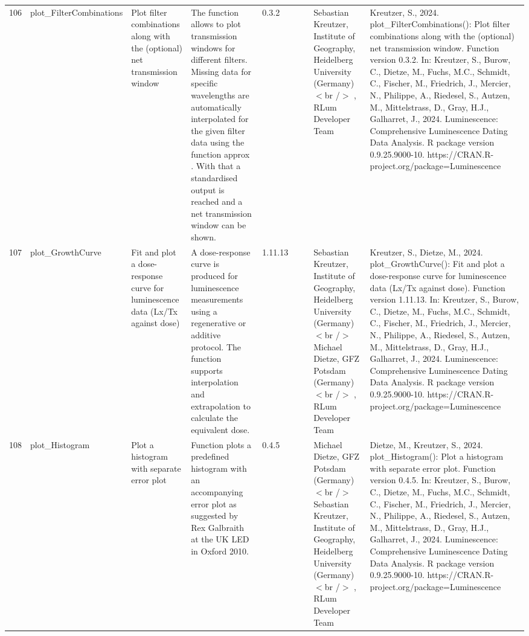 \begin{table}[ht]
\begin{tabular}{rllllllll}
 \\ 
  106 & plot\_FilterCombinations & Plot filter combinations along with the (optional) net transmission window & The function allows to plot transmission windows for different filters. Missing data for specific wavelengths are automatically interpolated for the given filter data using the function  approx . With that a standardised output is reached and a net transmission window can be shown. & 0.3.2
 &  &  & Sebastian Kreutzer, Institute of Geography, Heidelberg University (Germany)$<$br /$>$ , RLum Developer Team & Kreutzer, S., 2024. plot\_FilterCombinations(): Plot filter combinations along with the (optional) net transmission window. Function version 0.3.2. In: Kreutzer, S., Burow, C., Dietze, M., Fuchs, M.C., Schmidt, C., Fischer, M., Friedrich, J., Mercier, N., Philippe, A., Riedesel, S., Autzen, M., Mittelstrass, D., Gray, H.J., Galharret, J., 2024. Luminescence: Comprehensive Luminescence Dating Data Analysis. R package version 0.9.25.9000-10. https://CRAN.R-project.org/package=Luminescence
 \\ 
  107 & plot\_GrowthCurve & Fit and plot a dose-response curve for luminescence data (Lx/Tx against dose) & A dose-response curve is produced for luminescence measurements using a regenerative or additive protocol. The function supports interpolation and extrapolation to calculate the equivalent dose. & 1.11.13
 &  &  & Sebastian Kreutzer, Institute of Geography, Heidelberg University (Germany) $<$br /$>$ Michael Dietze, GFZ Potsdam (Germany)$<$br /$>$ , RLum Developer Team & Kreutzer, S., Dietze, M., 2024. plot\_GrowthCurve(): Fit and plot a dose-response curve for luminescence data (Lx/Tx against dose). Function version 1.11.13. In: Kreutzer, S., Burow, C., Dietze, M., Fuchs, M.C., Schmidt, C., Fischer, M., Friedrich, J., Mercier, N., Philippe, A., Riedesel, S., Autzen, M., Mittelstrass, D., Gray, H.J., Galharret, J., 2024. Luminescence: Comprehensive Luminescence Dating Data Analysis. R package version 0.9.25.9000-10. https://CRAN.R-project.org/package=Luminescence
 \\ 
  108 & plot\_Histogram & Plot a histogram with separate error plot & Function plots a predefined histogram with an accompanying error plot as suggested by Rex Galbraith at the UK LED in Oxford 2010. & 0.4.5
 &  &  & Michael Dietze, GFZ Potsdam (Germany) $<$br /$>$ Sebastian Kreutzer, Institute of Geography, Heidelberg University (Germany)$<$br /$>$ , RLum Developer Team & Dietze, M., Kreutzer, S., 2024. plot\_Histogram(): Plot a histogram with separate error plot. Function version 0.4.5. In: Kreutzer, S., Burow, C., Dietze, M., Fuchs, M.C., Schmidt, C., Fischer, M., Friedrich, J., Mercier, N., Philippe, A., Riedesel, S., Autzen, M., Mittelstrass, D., Gray, H.J., Galharret, J., 2024. Luminescence: Comprehensive Luminescence Dating Data Analysis. R package version 0.9.25.9000-10. https://CRAN.R-project.org/package=Luminescence

\end{tabular}
\end{table}
